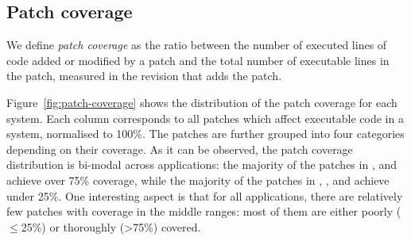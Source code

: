 \subsection{Patch coverage}
\label{sec:pcoverage}
\label{sec:lpcoverage}


We define {\em patch coverage} as the ratio between the number of
executed lines of code added or modified by a patch and the total
number of executable lines in the patch, measured in the revision that
adds the patch.

Figure~\ref{fig:patch-coverage} shows the distribution of the patch coverage for each
system. Each column corresponds to all patches which affect executable
code in a system, normalised to 100\%. The patches are further grouped into
four categories depending on their coverage.
As it can be observed, the patch coverage distribution is
bi-modal across applications: the majority of the patches
in \git, \memcached and \zeromq achieve over 75\% coverage, while the
majority of the patches in \beanstalkd, \binutils, \lighttpdtwo and \redis achieve
under 25\%.  One interesting aspect is that for all applications,
there are relatively few patches with coverage in the middle ranges:
most of them are either poorly ($\le$25\%) or thoroughly (\textgreater75\%)
covered.

